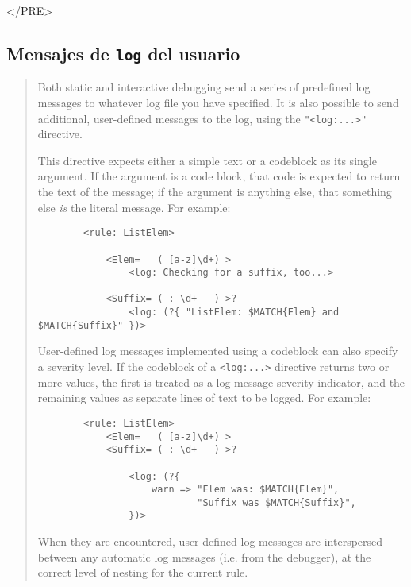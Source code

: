 \begin{rawhtml}
</PRE>

\end{rawhtml}

\subsection{Mensajes de {\tt log} del usuario}

\begin{it}\begin{quotation}
    Both static and interactive debugging send a series of predefined log
    messages to whatever log file you have specified. It is also possible to
    send additional, user-defined messages to the log, using the \verb|"<log:...>"|
    directive.

    This directive expects either a simple text or a codeblock as its single
    argument. If the argument is a code block, that code is expected to
    return the text of the message; if the argument is anything else, that
    something else \emph{is} the literal message. For example:

\begin{verbatim}
        <rule: ListElem>

            <Elem=   ( [a-z]\d+) >
                <log: Checking for a suffix, too...>

            <Suffix= ( : \d+   ) >?
                <log: (?{ "ListElem: $MATCH{Elem} and $MATCH{Suffix}" })>
\end{verbatim}

    User-defined log messages implemented using a codeblock can also specify
    a severity level. If the codeblock of a \verb"<log:...>" directive returns
    two or more values, the first is treated as a log message severity
    indicator, and the remaining values as separate lines of text to be
    logged. For example:

\begin{verbatim}
        <rule: ListElem>
            <Elem=   ( [a-z]\d+) >
            <Suffix= ( : \d+   ) >?

                <log: (?{
                    warn => "Elem was: $MATCH{Elem}",
                            "Suffix was $MATCH{Suffix}",
                })>
\end{verbatim}

    When they are encountered, user-defined log messages are interspersed
    between any automatic log messages (i.e. from the debugger), at the
    correct level of nesting for the current rule.
\end{quotation}\end{it}


